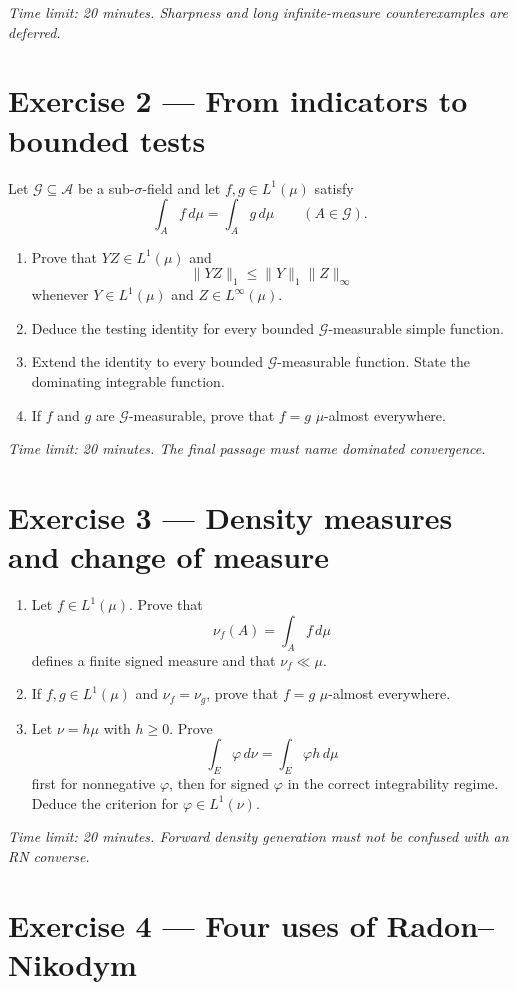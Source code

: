 \emph{Time limit: 20 minutes. Sharpness and long infinite-measure counterexamples are deferred.}

\section*{Exercise 2 — From indicators to bounded tests}

Let $\mathcal G\subseteq\mathcal A$ be a sub-$\sigma$-field and let $f,g\in L^1(\mu)$ satisfy
\[
\int_Af\,d\mu
=
\int_Ag\,d\mu
\qquad(A\in\mathcal G).
\]
\begin{enumerate}
  \item Prove that $YZ\in L^1(\mu)$ and
  \[
  \|YZ\|_1\le\|Y\|_1\|Z\|_\infty
  \]
  whenever $Y\in L^1(\mu)$ and $Z\in L^\infty(\mu)$.
  \item Deduce the testing identity for every bounded $\mathcal G$-measurable simple function.
  \item Extend the identity to every bounded $\mathcal G$-measurable function. State the dominating integrable function.
  \item If $f$ and $g$ are $\mathcal G$-measurable, prove that $f=g$ $\mu$-almost everywhere.
\end{enumerate}

\emph{Time limit: 20 minutes. The final passage must name dominated convergence.}

\section*{Exercise 3 — Density measures and change of measure}

\begin{enumerate}
  \item Let $f\in L^1(\mu)$. Prove that
  \[
  \nu_f(A)=\int_Af\,d\mu
  \]
  defines a finite signed measure and that $\nu_f\ll\mu$.
  \item If $f,g\in L^1(\mu)$ and $\nu_f=\nu_g$, prove that $f=g$ $\mu$-almost everywhere.
  \item Let $\nu=h\mu$ with $h\ge0$. Prove
  \[
  \int_E\varphi\,d\nu
  =
  \int_E\varphi h\,d\mu
  \]
  first for nonnegative $\varphi$, then for signed $\varphi$ in the correct integrability regime. Deduce the criterion for $\varphi\in L^1(\nu)$.
\end{enumerate}

\emph{Time limit: 20 minutes. Forward density generation must not be confused with an RN converse.}

\section*{Exercise 4 — Four uses of Radon--Nikodym}

